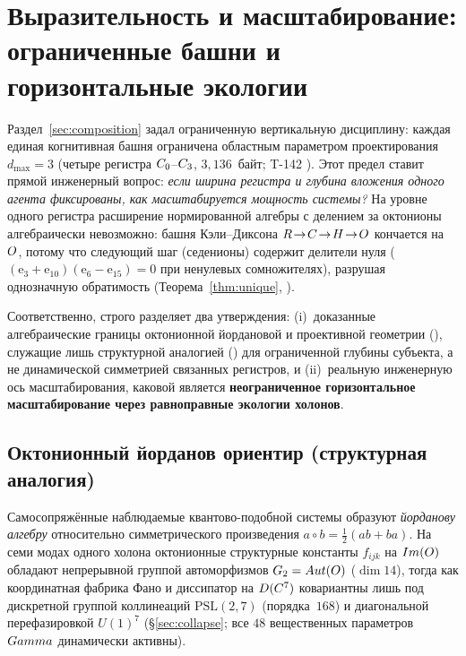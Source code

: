 \section{Выразительность и масштабирование: ограниченные башни и горизонтальные экологии}
\label{sec:scaling}

Раздел~\ref{sec:composition} задал ограниченную вертикальную дисциплину: каждая
единая когнитивная башня ограничена областным параметром проектирования
$d_{\max}=3$ (четыре регистра $C_0$--$C_3$, $3{,}136$~байт; T-142
). Этот предел ставит прямой инженерный вопрос: \emph{если ширина
регистра и глубина вложения одного агента фиксированы, как масштабируется
мощность системы?} На уровне одного регистра расширение нормированной алгебры с
делением за октонионы алгебраически невозможно: башня Кэли--Диксона
$R\!\to\!C\!\to\!H\!\to\!O$ кончается на $O$,
потому что следующий шаг (седенионы) содержит делители нуля
($(\mathrm{e}_3+\mathrm{e}_{10})(\mathrm{e}_6-\mathrm{e}_{15})=0$ при
ненулевых сомножителях), разрушая однозначную обратимость
(Теорема~\ref{thm:unique}, \cite{baez2002}).

Соответственно, \TALOS{} строго разделяет два утверждения: (i)~доказанные
алгебраические границы октонионной йордановой и проективной геометрии
(), служащие лишь структурной аналогией () для ограниченной
глубины субъекта, а не динамической симметрией связанных регистров, и
(ii)~реальную инженерную ось масштабирования, каковой является
\textbf{неограниченное горизонтальное масштабирование через равноправные
экологии холонов}.

\subsection{Октонионный йорданов ориентир (структурная аналогия)}
\label{subsec:jordan}

Самосопряжённые наблюдаемые квантово-подобной системы образуют \emph{йорданову
алгебру} относительно симметрического произведения $a\circ b=\tfrac12(ab+ba)$.
На семи модах одного холона октонионные структурные константы $f_{ijk}$ на
$Im(O)$ обладают непрерывной группой автоморфизмов
$G_2=Aut(O)$ ($\dim 14$), тогда как координатная фабрика Фано и
диссипатор на $D(C^7)$ ковариантны лишь под дискретной группой
коллинеаций $\mathrm{PSL}(2,7)$ (порядка~$168$) и диагональной перефазировкой
$U(1)^7$ (\S\ref{sec:collapse}; все $48$ вещественных параметров $Gamma$
динамически активны).

